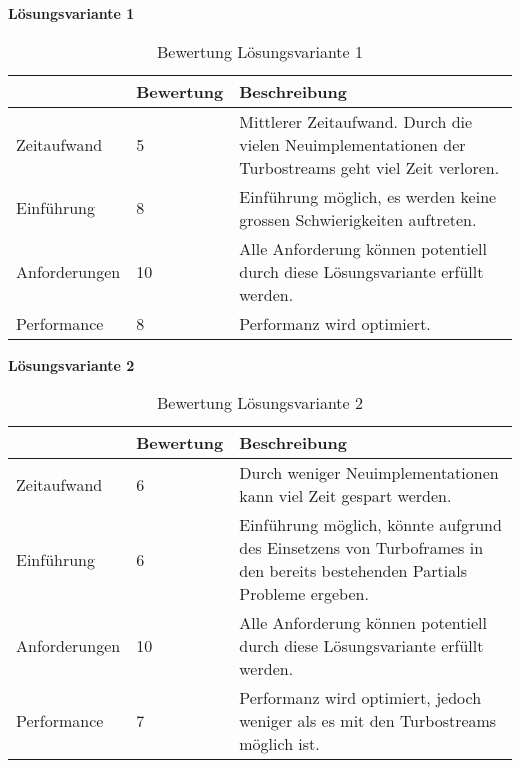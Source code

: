 \textbf{Lösungsvariante 1}

\begin{table}[h!]
   \begin{tabular}{|L{0.2\textwidth}|L{0.2\textwidth}|L{0.6\textwidth}|}
      \hline
       & \color{white}\textbf{Bewertung} & \color{white}\textbf{Beschreibung}\\[2pt]
      \hline
      Zeitaufwand & 5 & Mittlerer Zeitaufwand. Durch die vielen Neuimplementationen der Turbostreams geht viel Zeit verloren. \\
      \hline
      Einführung & 8 & Einführung möglich, es werden keine grossen Schwierigkeiten auftreten. \\
      \hline 
      Anforderungen & 10 & Alle Anforderung können potentiell durch diese Lösungsvariante erfüllt werden. \\
      \hline
      Performance & 8 & Performanz wird optimiert. \\
      \hline
   \end{tabular}
   \caption{Bewertung Lösungsvariante 1}
\end{table}

\newpage

\textbf{Lösungsvariante 2}

\begin{table}[h!]
   \begin{tabular}{|L{0.2\textwidth}|L{0.2\textwidth}|L{0.6\textwidth}|}
      \hline
       & \color{white}\textbf{Bewertung} & \color{white}\textbf{Beschreibung}\\[2pt]
      \hline
      Zeitaufwand & 6 & Durch weniger Neuimplementationen kann viel Zeit gespart werden. \\
      \hline
      Einführung & 6 & Einführung möglich, könnte aufgrund des Einsetzens von Turboframes in den bereits bestehenden Partials Probleme ergeben. \\
      \hline 
      Anforderungen & 10 & Alle Anforderung können potentiell durch diese Lösungsvariante erfüllt werden. \\
      \hline
      Performance & 7 & Performanz wird optimiert, jedoch weniger als es mit den Turbostreams möglich ist. \\
      \hline
   \end{tabular}
   \caption{Bewertung Lösungsvariante 2}
\end{table}

\newpage
\storeareas\bruteforceanalysis
{}
\areaset
  {\dimexpr\the\paperwidth-3cm\relax}
  {\dimexpr\the\paperheight-7.5cm\relax}
\recalctypearea

